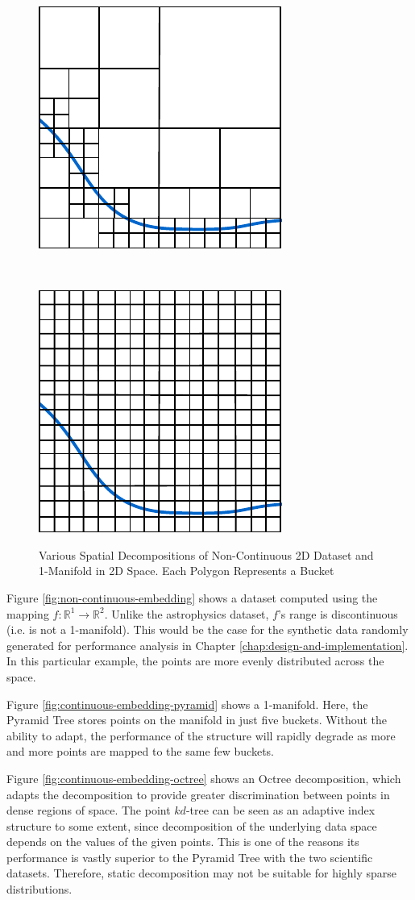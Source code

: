 \begin{figure}
\begin{center}
\begin{subfloat}{%
			\includegraphics[scale=0.65]{figures/1d_manifold_octree.pdf}
		}
		\end{subfloat}~~~~~
		\begin{subfloat}{%
			\includegraphics[scale=0.65]{figures/1d_manifold_multigrid.pdf}
		}
		\end{subfloat}
	\end{center}

	\caption{Various Spatial Decompositions of Non-Continuous 2D Dataset and 1-Manifold in 2D Space. Each Polygon Represents a Bucket}
	\label{fig:static-adaptive-decomposition}
\end{figure}

Figure \ref{fig:non-continuous-embedding} shows a dataset computed using the mapping $f : \mathbb{R}^1 \rightarrow \mathbb{R}^2$. Unlike the astrophysics dataset, $f$'s range is discontinuous (i.e. is not a 1-manifold). This would be the case for the synthetic data randomly generated for performance analysis in Chapter \ref{chap:design-and-implementation}. In this particular example, the points are more evenly distributed across the space.

Figure \ref{fig:continuous-embedding-pyramid} shows a 1-manifold. Here, the Pyramid Tree stores points on the manifold in just five buckets. Without the ability to adapt, the performance of the structure will rapidly degrade as more and more points are mapped to the same few buckets.

Figure \ref{fig:continuous-embedding-octree} shows an Octree decomposition, which adapts the decomposition to provide greater discrimination between points in dense regions of space. The point $kd$-tree can be seen as an adaptive index structure to some extent, since decomposition of the underlying data space depends on the values of the given points. This is one of the reasons its performance is vastly superior to the Pyramid Tree with the two scientific datasets. Therefore, static decomposition may not be suitable for highly sparse distributions.

